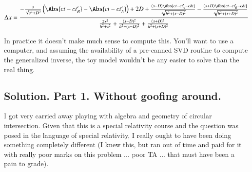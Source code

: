 \begin{equation}\label{eqn:relativisticElectrodynamicsA1:400}
\Delta x =
\frac{
   -\frac{s}{\sqrt{s^2 + D^2}} \left( \Abs{ ct - c t_B' } - \Abs{ c t - c t_A'} \right) +2 D
   + \frac{(s - D)\Abs{c t - c t_A' - c \delta t} }{ \sqrt{ h^2 + (s - D)^2 } } 
   - \frac{(s + D)\Abs{c t - c t_B' - c \delta t} }{ \sqrt{ h^2 + (s + D)^2 } } }
{
   \frac{2 s^2}{h^2 + s^2}
   +\frac{(s - D)^2}{h^2 + (s -D)^2}
   +\frac{(s + D)^2}{h^2 + (s +D)^2}
}
\end{equation}

In practice it doesn't make much sense to compute this.  You'll want to use a computer, and assuming the availability of a pre-canned SVD routine to compute the generalized inverse, the toy model wouldn't be any easier to solve than the real thing.



%
%
%

\subsection{Solution. Part 1.  Without goofing around.}

I got very carried away playing with algebra and geometry of circular intersection.  Given that this is a special relativity course and the question was posed in the language of special relativity, I really ought to have been doing something completely different (I knew this, but ran out of time and paid for it with really poor marks on this problem ... poor TA ... that must have been a pain to grade).

